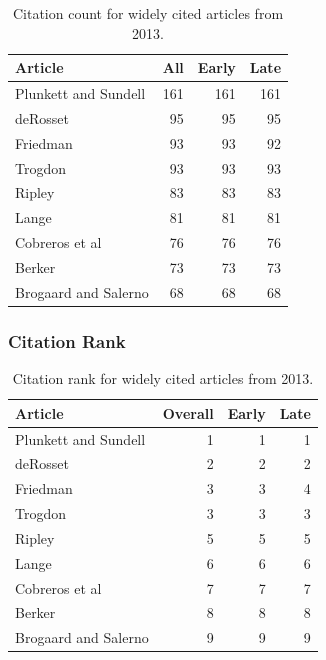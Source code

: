\documentclass[
  10pt,
  letterpaper,
  DIV=11,
  numbers=noendperiod,
  twoside]{scrartcl}
\begin{document}
\begin{longtable}[]{@{}lrrr@{}}

\caption{\label{tbl-citation-count-2013}Citation count for widely cited
articles from 2013.}

\tabularnewline

\toprule\noalign{}
Article & All & Early & Late \\
\midrule\noalign{}
\endhead
\bottomrule\noalign{}
\endlastfoot
Plunkett and Sundell & 161 & 161 & 161 \\
deRosset & 95 & 95 & 95 \\
Friedman & 93 & 93 & 92 \\
Trogdon & 93 & 93 & 93 \\
Ripley & 83 & 83 & 83 \\
Lange & 81 & 81 & 81 \\
Cobreros et al & 76 & 76 & 76 \\
Berker & 73 & 73 & 73 \\
Brogaard and Salerno & 68 & 68 & 68 \\

\end{longtable}

\subsubsection*{Citation Rank}\label{citation-rank-37}

\begin{longtable}[]{@{}lrrr@{}}

\caption{\label{tbl-citation-rank-2013}Citation rank for widely cited
articles from 2013.}

\tabularnewline

\toprule\noalign{}
Article & Overall & Early & Late \\
\midrule\noalign{}
\endhead
\bottomrule\noalign{}
\endlastfoot
Plunkett and Sundell & 1 & 1 & 1 \\
deRosset & 2 & 2 & 2 \\
Friedman & 3 & 3 & 4 \\
Trogdon & 3 & 3 & 3 \\
Ripley & 5 & 5 & 5 \\
Lange & 6 & 6 & 6 \\
Cobreros et al & 7 & 7 & 7 \\
Berker & 8 & 8 & 8 \\
Brogaard and Salerno & 9 & 9 & 9 \\

\end{longtable}
\end{document}

